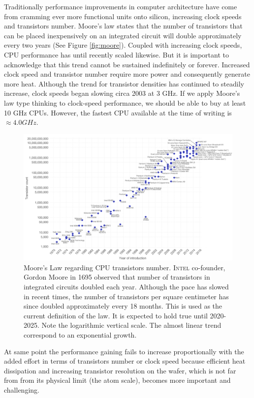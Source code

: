 Traditionally performance improvements in computer architecture have come from cramming ever more functional units onto silicon, increasing clock speeds and transistors number. Moore's law states that the number of transistors that can be placed inexpensively on an integrated circuit will double approximately every two years (See Figure \ref{fig:moore}). Coupled with increasing clock speeds, CPU performance has until recently scaled likewise. But it is important to acknowledge that this trend cannot be sustained indefinitely or forever. Increased clock speed and transistor number require more power and consequently generate more heat. Although the trend for transistor densities has continued to steadily increase, clock speeds began slowing circa 2003 at 3 GHz. If we apply Moore’s law type thinking to clock-speed performance, we should be able to buy at least 10 GHz CPUs. However, the fastest CPU available at the time of writing is $\approx 4.0 GHz$.
\begin{figure}[!htbp]
		\hspace*{-1.8cm}
\centering
\includegraphics[width=1.2\textwidth]{./images/parallel_programming/moore_law2}
\caption[Moore's Law regarding CPU transistors number.]{Moore's Law regarding CPU transistors number. \textsc{Intel} co-founder, Gordon Moore in 1695 observed that number of transistors in integrated circuits doubled each year. Although the pace has slowed in recent times, the number of transistors per square centimeter has since doubled approximately every 18 months. This is used as the current definition of the law. It is expected to hold true until 2020-2025. Note the logarithmic vertical scale. The almost linear trend correspond to an exponential growth.
}
\label{mooreLaw}
\end{figure}
At same point the performance gaining fails to increase proportionally with the added effort in terms of transistors number or clock speed because efficient heat dissipation and increasing transistor resolution on the wafer, which is not far from from its physical limit (the atom scale),  becomes more important and challenging.
